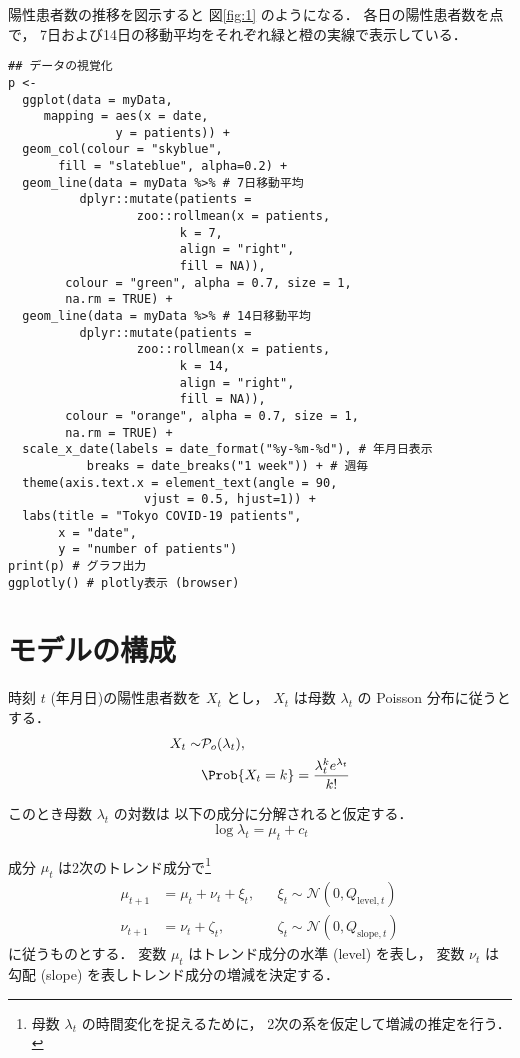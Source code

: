 \documentclass[10pt,oneside,fleqn]{scrartcl}
\begin{document}
陽性患者数の推移を図示すると
図\ref{fig:1} のようになる．
各日の陽性患者数を点で，
7日および14日の移動平均をそれぞれ緑と橙の実線で表示している．

\begin{figure}[htbp]
  \centering
  \myGraph[1]{}
\end{figure}

\begin{verbatim}
## データの視覚化
p <-
  ggplot(data = myData,
	 mapping = aes(x = date,
		       y = patients)) +
  geom_col(colour = "skyblue",
	   fill = "slateblue", alpha=0.2) + 
  geom_line(data = myData %>% # 7日移動平均
	      dplyr::mutate(patients =
			      zoo::rollmean(x = patients,
					    k = 7, 
					    align = "right",
					    fill = NA)),
	    colour = "green", alpha = 0.7, size = 1,
	    na.rm = TRUE) +
  geom_line(data = myData %>% # 14日移動平均
	      dplyr::mutate(patients =
			      zoo::rollmean(x = patients,
					    k = 14, 
					    align = "right",
					    fill = NA)),
	    colour = "orange", alpha = 0.7, size = 1,
	    na.rm = TRUE) +
  scale_x_date(labels = date_format("%y-%m-%d"), # 年月日表示
	       breaks = date_breaks("1 week")) + # 週毎
  theme(axis.text.x = element_text(angle = 90, 
				   vjust = 0.5, hjust=1)) +
  labs(title = "Tokyo COVID-19 patients",
       x = "date",
       y = "number of patients")
print(p) # グラフ出力
ggplotly() # plotly表示 (browser)
\end{verbatim}

\section{モデルの構成}
\label{sec:org6e41ef1}

時刻 \(t\) (年月日)の陽性患者数を \(X_{t}\) とし，
\(X_{t}\) は母数 \(\lambda_{t}\) の Poisson 分布に従うとする．
\begin{align}
  X_{t}\sim &\mathcal{P}_{o}(\lambda_{t}), \\   
  &\Prob{X_{t}=k}=\frac{\lambda_{t}^{k}e^{\lambda_{t}}}{k!}
\end{align}

このとき母数 \(\lambda_{t}\) の対数は
以下の成分に分解されると仮定する．
\begin{equation}
  \log\lambda_{t}
  =\mu_{t}+c_{t}
\end{equation}

成分 \(\mu_{t}\) は2次のトレンド成分で\footnote{母数 \(\lambda_{t}\) の時間変化を捉えるために，
2次の系を仮定して増減の推定を行う．}
\begin{align}
  \mu_{t+1}
  &=\mu_{t}+\nu_{t}+\xi_{t},&&\xi_{t}\sim\mathcal{N}(0,Q_{\mathrm{level},t})\\
  \nu_{t+1}
  &=\nu_{t}+\zeta_{t},&&\zeta_{t}\sim\mathcal{N}(0,Q_{\mathrm{slope},t})
\end{align}
に従うものとする．
変数 \(\mu_{t}\) はトレンド成分の水準 (level) を表し，
変数 \(\nu_{t}\) は勾配 (slope) を表しトレンド成分の増減を決定する．
\end{document}
